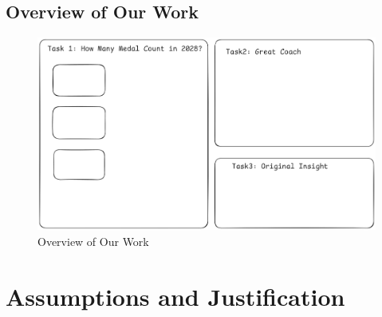 \documentclass{mcmthesis}
\begin{document}
	\subsection{Overview of Our Work}
		\begin{figure}[H]
		\centering
		\includegraphics[width=1\linewidth]{fig/1.png}
		\caption{Overview of Our Work}
		\label{fig:Overview of Our Work}
	\end{figure}
	
	
	
	
	
	
	
	
\section{Assumptions and Justification}
\end{document}
